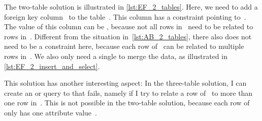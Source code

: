 The two-table solution is illustrated in \cref{lst:EF_2_tables}.
Here, we need to add a foreign key column~ to the table~.
This column has a  constraint pointing to~.
The value of this column can be , because not all rows in~ need to be related to rows in~.
Different from the  situation in~\cref{lst:AB_2_tables}, there also does not need to be a  constraint here, because each row of~ can be related to multiple rows in~.
We also only need a single  to merge the data, as illustrated in \cref{lst:EF_2_insert_and_select}.

This solution has another interesting aspect:
In the three-table solution, I can create an  or  query to  that fails, namely if I try to relate a row of~ to more than one row in~.
This is not possible in the two-table solution, because each row of~ only has one attribute value~.%
%
\endhsection%
%
